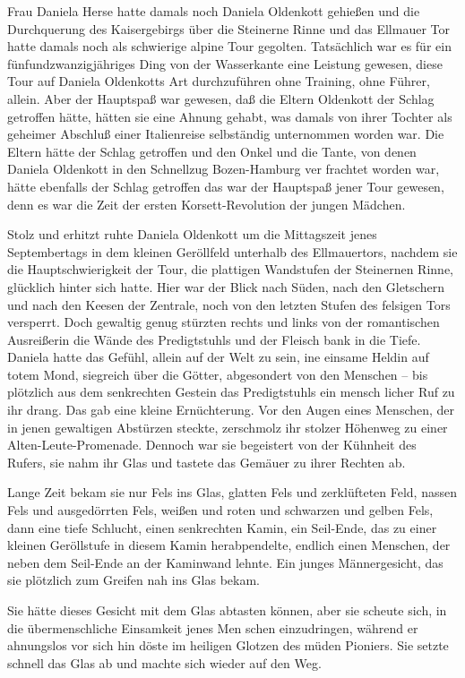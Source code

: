 Frau Daniela Herse hatte damals noch Daniela Oldenkott
gehießen und die Durchquerung des Kaisergebirgs über die
Steinerne Rinne und das Ellmauer Tor hatte damals noch
als schwierige alpine Tour gegolten. Tatsächlich war es für
ein fünfundzwanzigjähriges Ding von der Wasserkante eine
Leistung gewesen, diese Tour auf Daniela Oldenkotts Art
durchzuführen\dopp{} ohne Training, ohne Führer, allein. Aber der
Hauptspaß war gewesen, daß die Eltern Oldenkott der Schlag
getroffen hätte, hätten sie eine Ahnung gehabt, was damals
von ihrer Tochter als geheimer Abschluß einer Italienreise
selbständig unternommen worden war. Die Eltern hätte der
Schlag getroffen und den Onkel und die Tante, von denen
Daniela Oldenkott in den Schnellzug Bozen-Hamburg ver\-%
frachtet worden war, hätte ebenfalls der Schlag getroffen\dopp{}
das war der Hauptspaß jener Tour gewesen, denn es war die
Zeit der ersten Korsett-Revolution der jungen Mädchen.

Stolz und erhitzt ruhte Daniela Oldenkott um die Mittagszeit
jenes Septembertags in dem kleinen Geröllfeld unterhalb
des Ellmauertors, nachdem sie die Hauptschwierigkeit der
Tour, die plattigen Wandstufen der Steinernen Rinne,
glücklich hinter sich hatte. Hier war der Blick nach Süden,
nach den Gletschern und nach den Keesen der Zentrale,
noch von den letzten Stufen des felsigen Tors versperrt. Doch
gewaltig genug stürzten rechts und links von der romantischen
Ausreißerin die Wände des Predigtstuhls und der Fleisch\-%
bank in die Tiefe. Daniela hatte das Gefühl, allein auf der
Welt zu sein, ine einsame Heldin auf totem Mond, siegreich
über die Götter, abgesondert von den Menschen -- bis plötzlich
aus dem senkrechten Gestein das Predigtstuhls ein mensch\-%
licher Ruf zu ihr drang. Das gab eine kleine Ernüchterung.
Vor den Augen eines Menschen, der in jenen gewaltigen
Abstürzen steckte, zerschmolz ihr stolzer Höhenweg zu einer
Alten-Leute-Promenade. Dennoch war sie begeistert von der
Kühnheit des Rufers, sie nahm ihr Glas und tastete das
Gemäuer zu ihrer Rechten ab.

Lange Zeit bekam sie nur Fels ins Glas, glatten Fels und
zerklüfteten Feld, nassen Fels und ausgedörrten Fels, weißen
und roten und schwarzen und gelben Fels, dann eine tiefe
Schlucht, einen senkrechten Kamin, ein Seil-Ende, das zu
einer kleinen Geröllstufe in diesem Kamin herabpendelte,
endlich einen Menschen, der neben dem Seil-Ende an der
Kaminwand lehnte. Ein junges Männergesicht, das sie plötzlich
zum Greifen nah ins Glas bekam.

Sie hätte dieses Gesicht mit dem Glas abtasten können, aber
sie scheute sich, in die übermenschliche Einsamkeit jenes Men\-%
schen einzudringen, während er ahnungslos vor sich hin döste
im heiligen Glotzen des müden Pioniers. Sie setzte schnell das
Glas ab und machte sich wieder auf den Weg.

